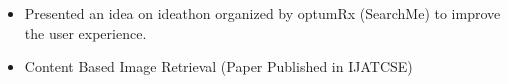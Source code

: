 \documentclass[10pt,a4paper,ragged2e]{altacv}
\begin{document}
\begin{itemize}
\item\linespread{1.2} \large Presented an idea on ideathon organized by optumRx (SearchMe) to improve the user experience.

\item  Content Based Image Retrieval (Paper Published in IJATCSE)


\end{itemize}





%




\clearpage

% 
% 
% 
% 
% 
% 
% 
\end{document}
